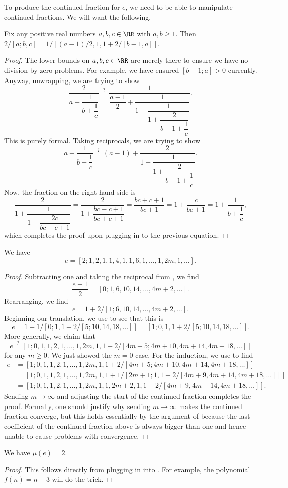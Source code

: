 \documentclass[../notes.tex]{subfiles}
\begin{document}
To produce the continued fraction for $e$, we need to be able to manipulate continued fractions. We will want the following.
\begin{lemma} \label{lem:twice-simple-cf}
	Fix any positive real numbers $a,b,c\in\RR$ with $a,b\ge1$. Then $2/[a;b,c]=1/[(a-1)/2,1,1+2/[b-1,a]]$.
\end{lemma}
\begin{proof}
	The lower bounds on $a,b,c\in\RR$ are merely there to ensure we have no division by zero problems. For example, we have ensured $[b-1;a]>0$ currently. Anyway, unwrapping, we are trying to show
	\[\dfrac2{a+\dfrac1{b+\dfrac1c}}\stackrel?=\dfrac1{\dfrac{a-1}2+\dfrac1{1+\dfrac1{1+\dfrac2{b-1+\dfrac1c}}}}.\]
	This is purely formal. Taking reciprocals, we are trying to show
	\[a+\dfrac1{b+\dfrac1c}\stackrel?=(a-1)+\dfrac2{1+\dfrac1{1+\dfrac2{b-1+\dfrac1c}}}.\]
	Now, the fraction on the right-hand side is
	\[\dfrac2{1+\dfrac1{1+\dfrac{2c}{bc-c+1}}}=\dfrac2{1+\dfrac{bc-c+1}{bc+c+1}}=\frac{bc+c+1}{bc+1}=1+\frac c{bc+1}=1+\dfrac1{b+\dfrac1c},\]
	which completes the proof upon plugging in to the previous equation.
\end{proof}
\begin{theorem} \label{thm:e-cf}
	We have
	\[e=[2;1,2,1,1,4,1,1,6,1,\ldots,1,2m,1,\ldots].\]
\end{theorem}
\begin{proof}
	Subtracting one and taking the reciprocal from , we find
	\[\frac{e-1}2=[0;1,6,10,14,\ldots,4m+2,\ldots].\]
	Rearranging, we find
	\[e=1+2/[1;6,10,14,\ldots,4m+2,\ldots].\]
	Beginning our translation, we use  to see that this is
	\[e=1+1/[0;1,1+2/[5;10,14,18,\ldots]]=[1;0,1,1+2/[5;10,14,18,\ldots]].\]
	More generally, we claim that
	\[e\stackrel?=[1;0,1,1,2,1,\ldots,1,2m,1,1+2/[4m+5;4m+10,4m+14,4m+18,\ldots]]\]
	for any $m\ge0$. We just showed the $m=0$ case. For the induction, we use  to find
	\begin{align*}
		e &= [1;0,1,1,2,1,\ldots,1,2m,1,1+2/[4m+5;4m+10,4m+14,4m+18,\ldots]] \\
		&= [1;0,1,1,2,1,\ldots,1,2m,1,1+1/[2m+1;1,1+2/[4m+9,4m+14,4m+18,\ldots]]] \\
		&= [1;0,1,1,2,1,\ldots,1,2m,1,1,2m+2,1,1+2/[4m+9,4m+14,4m+18,\ldots]].
	\end{align*}
	Sending $m\to\infty$ and adjusting the start of the continued fraction completes the proof. Formally, one should justify why sending $m\to\infty$ makes the continued fraction converge, but this holds essentially by the argument of  because the last coefficient of the continued fraction above is always bigger than one and hence unable to cause problems with convergence.
\end{proof}
\begin{corollary}
	We have $\mu(e)=2$.
\end{corollary}
\begin{proof}
	This follows directly from plugging in  into . For example, the polynomial $f(n)=n+3$ will do the trick.
\end{proof}
\end{document}
